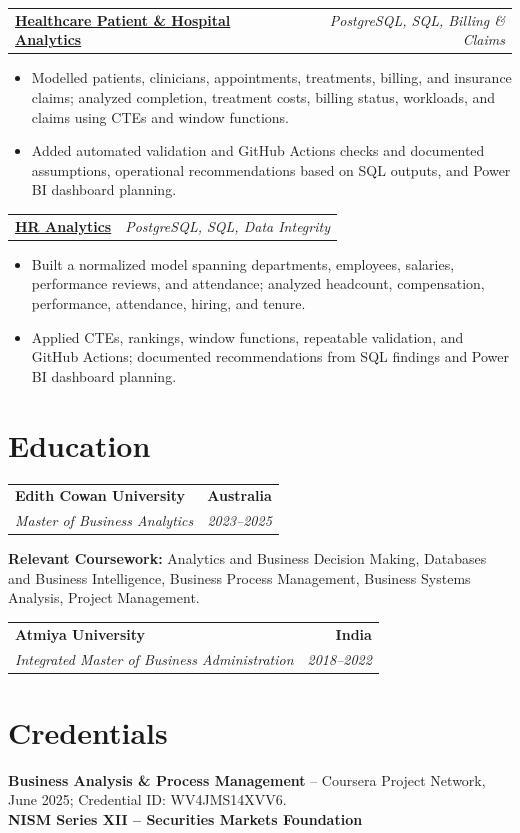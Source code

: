 \documentclass[letterpaper,10pt]{article}
\makeatletter
\newcommand{\role}[4]{%
  \begin{tabularx}{\textwidth}{@{}Xr@{}}
    \textbf{#1} & \textbf{#2} \\
    \textit{#3} & \textit{#4}
  \end{tabularx}\vspace{-1pt}
}
\newcommand{\project}[2]{%
  \begin{tabularx}{\textwidth}{@{}Xr@{}}
    \textbf{#1} & \textit{#2}
  \end{tabularx}\vspace{-1pt}
}
\makeatother
\begin{document}
\project{\href{https://github.com/jainalimehta/Healthcare-Analytics}{Healthcare Patient \& Hospital Analytics}}{PostgreSQL, SQL, Billing \& Claims}
\begin{itemize}
  \item Modelled patients, clinicians, appointments, treatments, billing, and insurance claims; analyzed completion, treatment costs, billing status, workloads, and claims using CTEs and window functions.
  \item Added automated validation and GitHub Actions checks and documented assumptions, operational recommendations based on SQL outputs, and Power BI dashboard planning.
\end{itemize}
\vspace{1pt}

\project{\href{https://github.com/jainalimehta/HR-Analytics}{HR Analytics}}{PostgreSQL, SQL, Data Integrity}
\begin{itemize}
  \item Built a normalized model spanning departments, employees, salaries, performance reviews, and attendance; analyzed headcount, compensation, performance, attendance, hiring, and tenure.
  \item Applied CTEs, rankings, window functions, repeatable validation, and GitHub Actions; documented recommendations from SQL findings and Power BI dashboard planning.
\end{itemize}

\section{Education}
\role{Edith Cowan University}{Australia}{Master of Business Analytics}{2023--2025}
\small\textbf{Relevant Coursework:} Analytics and Business Decision Making, Databases and Business Intelligence, Business Process Management, Business Systems Analysis, Project Management.\\[2pt]
\role{Atmiya University}{India}{Integrated Master of Business Administration}{2018--2022}

\section{Credentials}
\small\textbf{Business Analysis \& Process Management} -- Coursera Project Network, June 2025; Credential ID: WV4JMS14XVV6.\\[-0.2pt]
\small\textbf{NISM Series XII -- Securities Markets Foundation}
\end{document}
